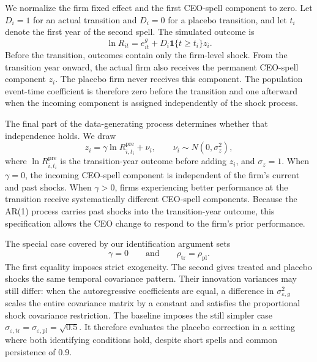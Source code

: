 \documentclass[sigconf,nonacm]{acmart}
\begin{document}
We normalize the firm fixed effect and the first CEO-spell component to zero. Let \(D_i=1\) for an actual transition and \(D_i=0\) for a placebo transition, and let \(t_i\) denote the first year of the second spell. The simulated outcome is
\begin{equation}
\ln R_{it}
=
e_{it}^{g}
+
D_i\mathbf{1}\{t\geq t_i\}z_i.
\label{eq:mc_outcome}
\end{equation}
Before the transition, outcomes contain only the firm-level shock. From the transition year onward, the actual firm also receives the permanent CEO-spell component \(z_i\). The placebo firm never receives this component. The population event-time coefficient is therefore zero before the transition and one afterward when the incoming component is assigned independently of the shock process.

The final part of the data-generating process determines whether that independence holds. We draw
\begin{equation}
z_i
=
\gamma \ln R_{i,t_i}^{\mathrm{pre}}
+
\nu_i,
\qquad
\nu_i
\sim
N\!\left(0,\sigma_z^2\right),
\label{eq:mc_ceo_assignment}
\end{equation}
where \(\ln R_{i,t_i}^{\mathrm{pre}}\) is the transition-year outcome before adding \(z_i\), and \(\sigma_z=1\). When \(\gamma=0\), the incoming CEO-spell component is independent of the firm's current and past shocks. When \(\gamma>0\), firms experiencing better performance at the transition receive systematically different CEO-spell components. Because the AR(1) process carries past shocks into the transition-year outcome, this specification allows the CEO change to respond to the firm's prior performance.

The special case covered by our identification argument sets
\begin{equation}
\gamma=0
\qquad\text{and}\qquad
\rho_{\mathrm{tr}}=\rho_{\mathrm{pl}}.
\label{eq:mc_identified_case}
\end{equation}
The first equality imposes strict exogeneity. The second gives treated and placebo shocks the same temporal covariance pattern. Their innovation variances may still differ: when the autoregressive coefficients are equal, a difference in \(\sigma_{\varepsilon,g}^{2}\) scales the entire covariance matrix by a constant and satisfies the proportional shock covariance restriction. The baseline imposes the still simpler case \(\sigma_{\varepsilon,\mathrm{tr}}=\sigma_{\varepsilon,\mathrm{pl}}=\sqrt{0.5}\). It therefore evaluates the placebo correction in a setting where both identifying conditions hold, despite short spells and common persistence of 0.9.
\end{document}
